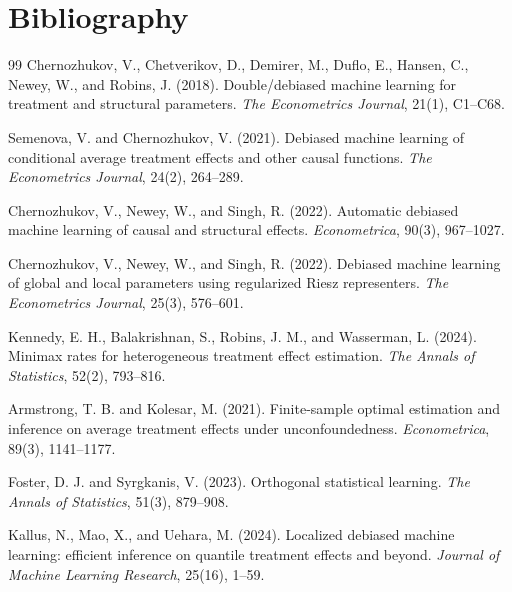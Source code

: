 \documentclass[11pt]{article}
\theoremstyle{definition}
\theoremstyle{plain}
\theoremstyle{remark}
\begin{document}
\section*{Bibliography}
\begin{thebibliography}{99}
Chernozhukov, V., Chetverikov, D., Demirer, M., Duflo, E., Hansen, C.,
Newey, W., and Robins, J. (2018).
Double/debiased machine learning for treatment and structural parameters.
\emph{The Econometrics Journal}, 21(1), C1--C68.

Semenova, V. and Chernozhukov, V. (2021).
Debiased machine learning of conditional average treatment effects and other
causal functions.
\emph{The Econometrics Journal}, 24(2), 264--289.

Chernozhukov, V., Newey, W., and Singh, R. (2022).
Automatic debiased machine learning of causal and structural effects.
\emph{Econometrica}, 90(3), 967--1027.

Chernozhukov, V., Newey, W., and Singh, R. (2022).
Debiased machine learning of global and local parameters using regularized
Riesz representers.
\emph{The Econometrics Journal}, 25(3), 576--601.

Kennedy, E. H., Balakrishnan, S., Robins, J. M., and Wasserman, L. (2024).
Minimax rates for heterogeneous treatment effect estimation.
\emph{The Annals of Statistics}, 52(2), 793--816.

Armstrong, T. B. and Kolesar, M. (2021).
Finite-sample optimal estimation and inference on average treatment effects
under unconfoundedness.
\emph{Econometrica}, 89(3), 1141--1177.

Foster, D. J. and Syrgkanis, V. (2023).
Orthogonal statistical learning.
\emph{The Annals of Statistics}, 51(3), 879--908.

Kallus, N., Mao, X., and Uehara, M. (2024).
Localized debiased machine learning: efficient inference on quantile treatment
effects and beyond.
\emph{Journal of Machine Learning Research}, 25(16), 1--59.
\end{thebibliography}
\end{document}
